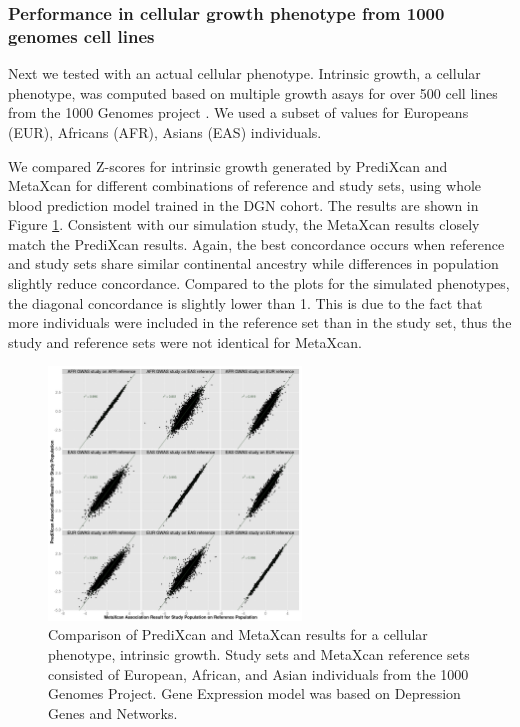\documentclass[10pt]{article}
\begin{document}
\subsubsection*{Performance in cellular growth phenotype from 1000 genomes cell lines}
 
Next we tested with an actual cellular phenotype. Intrinsic growth, a cellular phenotype, was computed based on multiple growth asays for over 500 cell lines from the 1000 Genomes project \cite{Im2012}. We used a subset of values for Europeans (EUR), Africans (AFR), Asians (EAS) individuals.
 
%
%
%

We compared Z-scores for  intrinsic growth generated by PrediXcan and MetaXcan for different combinations of reference and study sets, using whole blood prediction model trained in the DGN cohort. The results are shown in Figure \ref{fig:igrowthgrid}. Consistent with our simulation study, the MetaXcan results closely match the PrediXcan results. Again, the best concordance occurs when reference and study sets share similar continental ancestry while differences in population slightly reduce concordance. Compared to the plots for the simulated phenotypes, the diagonal concordance is slightly lower than 1. This is due to the fact that more individuals were included in the reference set than in the study set, thus the study and reference sets were not identical for MetaXcan.

\begin{figure}
\includegraphics[width=0.6\textwidth]{plots/Fig4-igrowth_grid.png}
\caption{Comparison of PrediXcan and MetaXcan results for a cellular phenotype, intrinsic growth. 
Study sets and MetaXcan reference sets consisted of European, African, and Asian
individuals from the 1000 Genomes Project. Gene Expression model was based on Depression Genes and Networks.}
\label{fig:igrowthgrid}
\end{figure}
\end{document}
